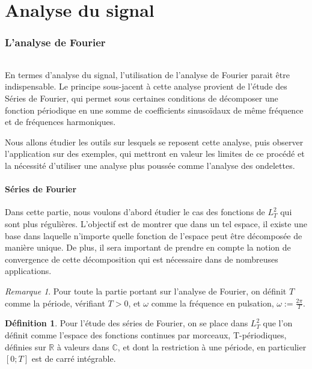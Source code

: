 \documentclass[]{article}
\theoremstyle{remark}
\newtheorem{myrem}{Remarque}
\theoremstyle{definition}
\newtheorem{mydef}{Définition}
\begin{document}
	\part{Analyse du signal}
	\section{L'analyse de Fourier}

	\paragraph*{}
En termes d'analyse du signal, l'utilisation de l'analyse de Fourier parait être indispensable. Le principe sous-jacent à cette analyse provient de l'étude des Séries de Fourier, qui permet sous certaines conditions de décomposer une fonction périodique en une somme de coefficients sinusoïdaux de même fréquence et de fréquences harmoniques. 


Nous allons étudier les outils sur lesquels se reposent cette analyse, puis observer l'application sur des exemples, qui mettront en valeur les limites de ce procédé et la nécessité d'utiliser une analyse plus poussée comme l'analyse des ondelettes.  

	
	\subsection {Séries de Fourier}
	Dans cette partie, nous voulons d'abord étudier le cas des fonctions de $L_T^2$ qui sont plus régulières. L'objectif est de montrer que dans un tel espace, il existe une base dans laquelle n'importe quelle fonction de l'espace peut être décomposée de manière unique. De plus, il sera important de prendre en compte la notion de convergence de cette décomposition qui est nécessaire dans de nombreuses applications. 
	
	
			\begin{myrem}
				Pour toute la partie portant sur l'analyse de Fourier, on définit $T$ comme la période, vérifiant $T>0$, et $\omega$ comme la fréquence en pulsation, $\omega := \frac{2\pi}{T}$.
			\end{myrem}
			
			\begin{mydef} 
				Pour l'étude des séries de Fourier, on se place dans $L^2_T$ que l'on définit comme l'espace des fonctions continues par morceaux, T-périodiques, définies sur $\mathbb{R}$ à valeurs dans $\mathbb{C}$, et dont la restriction à une période, en particulier $[0;T]$ est de carré intégrable.
			\end{mydef}
			
\end{document}
